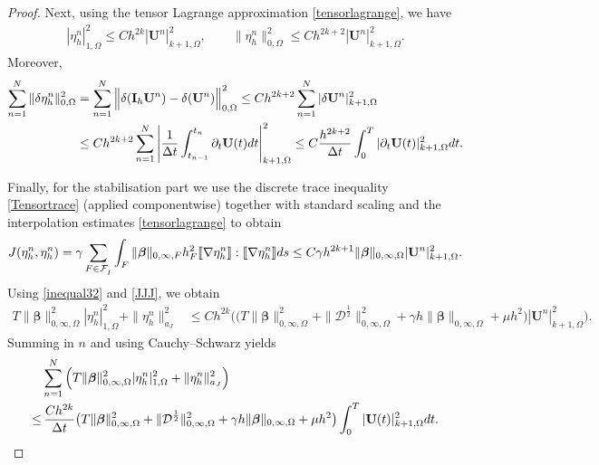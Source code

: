 \documentclass[10pt,a4paper]{amsart}
\newcommand\bU{\mathbf{U}}
\newcommand\bbeta{{\boldsymbol{\beta}}}
\newcommand\calF{\mathcal{F}}
\begin{document}
\begin{proof}
Next, using the tensor Lagrange approximation \eqref{tensorlagrange}, we have
\begin{align}
	|\eta^{n}_{h}|_{1,\Omega}^{2}\leq Ch^{2k}|\bU^{n} |_{k+1,\Omega}^{2},
	\qquad
	\|\eta^n_h\|_{0,\Omega}^2\le C  h^{2k+2}|\bU^n|_{k+1,\Omega}^{2}.\label{inequal32}
\end{align}
Moreover,
\begin{equation}
	\begin{aligned}
		\sum_{n=1}^{N}\|\delta \eta_{h}^{n}\|_{0,\Omega}^{2}
		&=\sum_{n=1}^{N}\Big\|\delta (\mathbf{I}_h\bU^{n})-\delta(\bU^{n})\Big\|_{0,\Omega}^{2}
		\leq Ch^{2k+2}\sum_{n=1}^{N}|\delta \mathbf{U}^{n} |_{k+1,\Omega}^{2}\\
		&\leq C h^{2k+2}\sum_{n=1}^{N}\left|\frac{1}{\Delta t}\int_{t_{n-1}}^{t_{n}}\partial_{t} \mathbf{U}(t) {\rm d}t\right|_{k+1,\Omega}^{2}
		\leq C\frac{h^{2k+2}}{\Delta t}\int_{0}^{T}|\partial_{t}\mathbf{U}(t)|_{k+1,\Omega}^{2}{\rm d}t.
	\end{aligned}
\end{equation}

Finally, for the stabilisation part we use the discrete trace inequality \eqref{Tensortrace} (applied componentwise) together with standard scaling and the interpolation estimates \eqref{tensorlagrange} to obtain
\begin{align}
	J(\eta_{h}^{n},\eta_{h}^{n})
	= \gamma \sum_{F\in\calF_I^{}}\int_F\|\bbeta \|_{0,\infty,F}  h_{F}^{2} \llbracket\nabla \eta_{h}^{n} \rrbracket :\llbracket\nabla \eta_{h}^{n} \rrbracket  {\rm d}s
	\leq C\gamma h^{2k+1}\|\bbeta\|_{0,\infty,\Omega} |\bU^{n} |_{k+1,\Omega}^{2}.\label{JJJ}
\end{align}
Using \eqref{inequal32} and \eqref{JJJ}, we obtain
\begin{equation}
	\begin{aligned}
		T\|\bbeta\|_{0,\infty,\Omega}^{2} |\eta^{n}_{h}|_{1,\Omega}^{2}
		+\|\eta^{n}_{h}\|_{a_J}^{2}
		&\leq Ch^{2k}\Big(\big(T\|\bbeta\|_{0,\infty,\Omega}^{2}
		+\|\mathcal{D}^{\frac{1}{2}}\|_{0,\infty,\Omega}^{2}
		+\gamma h\|\bbeta\|_{0,\infty,\Omega}
		+\mu h^{2}\big) |\mathbf{U}^{n}|_{k+1,\Omega}^{2}\Big).
	\end{aligned}
\end{equation}
Summing in $n$ and using Cauchy--Schwarz yields
\begin{align}\label{eq:summed_interp_bound}
		&\sum_{n=1}^{N}\Big(T\|\bbeta\|_{0,\infty,\Omega}^{2} |\eta^{n}_{h}|_{1,\Omega}^{2}
		+\|\eta^{n}_{h}\|_{a_J}^{2}\Big) \nonumber\\
		\leq&\,  \frac{Ch^{2k}}{\Delta t}\big(T\|\bbeta\|_{0,\infty,\Omega}^{2}
		+\|\mathcal{D}^{\frac{1}{2}}\|_{0,\infty,\Omega}^{2}
		+\gamma h\|\bbeta\|_{0,\infty,\Omega}
		+\mu h^{2}\big)\int_{0}^{T}|\mathbf{U}(t)|_{k+1,\Omega}^{2}{\rm d}t.
\end{align}


\end{proof}
\end{document}
